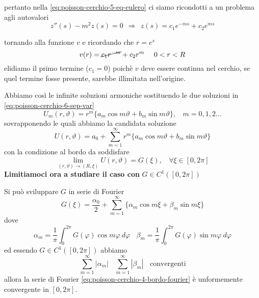 \documentclass[10pt,a4paper,twoside,openright]{book}
\begin{document}
\begin{dimostrazione}
\begin{enumerate}
              pertanto nella \eqref{eq:poisson-cerchio-5-eq-eulero} ci siamo ricondotti a un problema agli autovalori
              \begin{equation*}
                  z''(s) -m^{2} z(s) =0\ \ \Rightarrow \ \ z(s) =c_{1} e^{-ms} +c_{2} e^{ms}
              \end{equation*}

              tornando alla funzione $v$ e ricordando che $r=e^{s}$
              \begin{equation*}
                  v(r) =\cancel{c_{1} r^{-m}} +c_{2} r^{m} \ \ \ \ 0< r< R
              \end{equation*}elidiamo il primo termine ($c_{1}=0$) poichè $v$ deve essere continua nel cerchio, se quel termine fosse presente, sarebbe illimitata nell'origine.
    \end{enumerate}

    Abbiamo così le infinite soluzioni armoniche sostituendo le due soluzioni in \eqref{eq:poisson-cerchio-6-sep-var}
    \begin{equation*}
        U_{m}(r,\vartheta) =r^{m}\{a_{m}\cos m\vartheta +b_{m}\sin m\vartheta \},\ \ \ \ m=0,1,2\dotsc
    \end{equation*}
    sovrapponendo le quali abbiamo la candidata soluzione
    \begin{equation}
        U(r,\vartheta) =a_{0} +\sum\limits ^{\infty }_{m=1} r^{m}\{a_{m}\cos m\vartheta +b_{m}\sin m\vartheta \}
        \label{eq:poisson-cerchio-3-candidata}
    \end{equation}
    con la condizione al bordo da soddisfare
    \begin{equation}
        \lim _{(r,\vartheta)\rightarrow (R,\xi)} U(r,\vartheta) =G(\xi),\ \ \ \ \forall \xi \in [ 0,2\pi ]
        \label{eq:poisson-cerchio-2-condizione}
    \end{equation}
    \textbf{Limitiamoci ora a studiare il caso con }$G\in C^{1}([ 0,2\pi ])$

    Si può sviluppare $G$ in serie di Fourier
    \begin{equation}
        G(\xi) =\frac{\alpha _{0}}{2} +\sum\limits ^{\infty }_{m=1}\{\alpha _{m}\cos m\xi +\beta _{m}\sin m\xi \} \tag{F}
        \label{eq:poisson-cerchio-4-bordo-fourier}
    \end{equation}
    dove
    \begin{equation*}
        \alpha _{m} =\frac{1}{\pi }\int ^{2\pi }_{0} G(\varphi)\cos m\varphi \ d\varphi \ \ \ \ \beta _{m} =\frac{1}{\pi }\int ^{2\pi }_{0} G(\varphi)\sin m\varphi \ d\varphi
    \end{equation*}
    ed essendo $G\in C^{1}([ 0,2\pi ])$ abbiamo
    \begin{equation*}
        \sum\limits ^{\infty }_{m=1}| \alpha _{m}| \ \ \ \ \sum\limits ^{\infty }_{m=1}| \beta _{m}| \ \ \ \ \text{convergenti}
    \end{equation*}
    allora la serie di Fourier \eqref{eq:poisson-cerchio-4-bordo-fourier} è unformemente convergente in $[ 0,2\pi ]$.


\end{dimostrazione}
\end{document}
